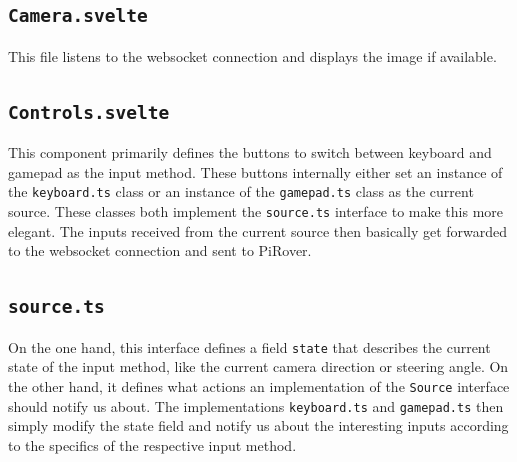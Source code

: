 \subsection*{\texttt{Camera.svelte}}

This file listens to the websocket connection and displays the image if available.

\subsection*{\texttt{Controls.svelte}}

This component primarily defines the buttons to switch between keyboard and gamepad as the input method. These buttons internally either set an instance of the \texttt{keyboard.ts} class or an instance of the \texttt{gamepad.ts} class as the current source. These classes both implement the \texttt{source.ts} interface to make this more elegant. The inputs received from the current source then basically get forwarded to the websocket connection and sent to PiRover. 

\subsection*{\texttt{source.ts}}

On the one hand, this interface defines a field \texttt{state} that describes the current state of the input method, like the current camera direction or steering angle. On the other hand, it defines what actions an implementation of the \texttt{Source} interface should notify us about. The implementations \texttt{keyboard.ts} and \texttt{gamepad.ts}  then simply modify the state field and notify us about the interesting inputs according to the specifics of the respective input method.

